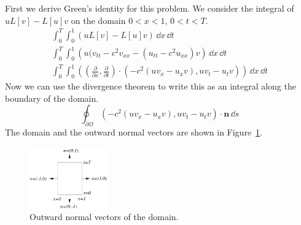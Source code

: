 {%
\begin{Solution}
  First we derive Green's identity for this problem.  We consider the integral
  of $u L[v] - L[u] v$ on the domain $0 < x < 1$, $0 < t < T$.
  \begin{gather*}
    \int_0^T \int_0^1 (u L[v] - L[u] v) \,\dd x \,\dd t \\
    \int_0^T \int_0^1 \left( u (v_{t t} - c^2 v_{x x}
      - (u_{t t} - c^2 u_{x x}) v \right) \,\dd x \,\dd t \\
    \int_0^T \int_0^1 \left( \left( \frac{\partial}{\partial x}, \frac{\partial}{\partial t} \right) \cdot
      \left( -c^2 (u v_x - u_x v), u v_t - u_t v \right) \right)
    \,\dd x \,\dd t 
  \end{gather*}
  Now we can use the divergence theorem to write this as an integral along the
  boundary of the domain.
  \[
  \oint_{\partial \Omega} \left( -c^2 (u v_x - u_x v), u v_t - u_t v \right) 
  \cdot \mathbf{n} \,\dd s
  \]
  The domain and the outward normal vectors are shown in 
  Figure~\ref{out_norm_1d_wave}.

  \begin{figure}[h!]
    \begin{center}
      \includegraphics[width=0.3\textwidth]{pde/green/out_norm_1d_wave}
    \end{center}
    \caption{Outward normal vectors of the domain.}
    \label{out_norm_1d_wave}
  \end{figure}


\end{Solution}}
